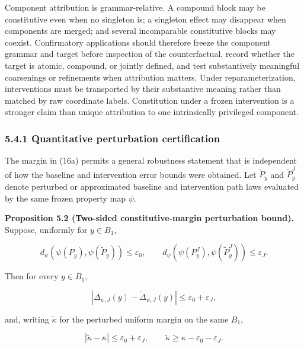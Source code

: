 \documentclass[10pt]{article}
\begin{document}
Component attribution is grammar-relative. A compound block may be
constitutive even when no singleton is; a singleton effect may disappear
when components are merged; and several incomparable constitutive blocks
may coexist. Confirmatory applications should therefore freeze the
component grammar and target before inspection of the counterfactual,
record whether the target is atomic, compound, or jointly defined, and
test substantively meaningful coarsenings or refinements when
attribution matters. Under reparameterization, interventions must be
transported by their substantive meaning rather than matched by raw
coordinate labels. Constitution under a frozen intervention is a
stronger claim than unique attribution to one intrinsically privileged
component.


\subsubsection{5.4.1 Quantitative perturbation certification}\label{quantitative-perturbation-certification}

The margin in (16a) permits a general robustness statement that is independent of how the baseline and intervention error bounds were obtained. Let \(\widetilde P_y\) and \(\widetilde P_y^J\) denote perturbed or approximated baseline and intervention path laws evaluated by the same frozen property map \(\psi\).

\textbf{Proposition 5.2 (Two-sided constitutive-margin perturbation bound).} Suppose, uniformly for \(y\in B_1\),

\begin{equation}
d_\psi\!\left(\psi(P_y),\psi(\widetilde P_y)\right)\le\varepsilon_0,
\qquad
d_\psi\!\left(\psi(P_y^J),\psi(\widetilde P_y^J)\right)\le\varepsilon_J.
\tag{16b}\label{eq:16b}
\end{equation}

Then for every \(y\in B_1\),

\begin{equation}
\left|\Delta_{\psi,J}(y)-\widetilde\Delta_{\psi,J}(y)\right|\le\varepsilon_0+\varepsilon_J,
\tag{16c}\label{eq:16c}
\end{equation}

and, writing \(\widetilde\kappa\) for the perturbed uniform margin on the same \(B_1\),

\begin{equation}
|\widetilde\kappa-\kappa|\le\varepsilon_0+\varepsilon_J,
\qquad
\widetilde\kappa\ge\kappa-\varepsilon_0-\varepsilon_J.
\tag{16d}\label{eq:16d}
\end{equation}
\end{document}
